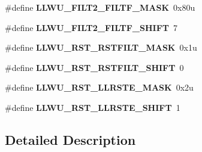 \begin{DoxyCompactItemize}
\item 
\hypertarget{group___l_l_w_u___register___masks_gab60be1393d84433fe44d4b332a77537c}{}\#define {\bfseries L\+L\+W\+U\+\_\+\+F\+I\+L\+T2\+\_\+\+F\+I\+L\+T\+F\+\_\+\+M\+A\+S\+K}~0x80u\label{group___l_l_w_u___register___masks_gab60be1393d84433fe44d4b332a77537c}

\item 
\hypertarget{group___l_l_w_u___register___masks_ga20b3ccaef11cade3a0dc88b3a378b790}{}\#define {\bfseries L\+L\+W\+U\+\_\+\+F\+I\+L\+T2\+\_\+\+F\+I\+L\+T\+F\+\_\+\+S\+H\+I\+F\+T}~7\label{group___l_l_w_u___register___masks_ga20b3ccaef11cade3a0dc88b3a378b790}

\item 
\hypertarget{group___l_l_w_u___register___masks_ga6a909bf1d49bb4f85ad988396fe928f2}{}\#define {\bfseries L\+L\+W\+U\+\_\+\+R\+S\+T\+\_\+\+R\+S\+T\+F\+I\+L\+T\+\_\+\+M\+A\+S\+K}~0x1u\label{group___l_l_w_u___register___masks_ga6a909bf1d49bb4f85ad988396fe928f2}

\item 
\hypertarget{group___l_l_w_u___register___masks_gaaa76fead204f735855760c2f071ac11f}{}\#define {\bfseries L\+L\+W\+U\+\_\+\+R\+S\+T\+\_\+\+R\+S\+T\+F\+I\+L\+T\+\_\+\+S\+H\+I\+F\+T}~0\label{group___l_l_w_u___register___masks_gaaa76fead204f735855760c2f071ac11f}

\item 
\hypertarget{group___l_l_w_u___register___masks_ga9c57c7139b6659782c0a5e160b790c3e}{}\#define {\bfseries L\+L\+W\+U\+\_\+\+R\+S\+T\+\_\+\+L\+L\+R\+S\+T\+E\+\_\+\+M\+A\+S\+K}~0x2u\label{group___l_l_w_u___register___masks_ga9c57c7139b6659782c0a5e160b790c3e}

\item 
\hypertarget{group___l_l_w_u___register___masks_gaf1c8b75e71d3086612da4e1e2f768d72}{}\#define {\bfseries L\+L\+W\+U\+\_\+\+R\+S\+T\+\_\+\+L\+L\+R\+S\+T\+E\+\_\+\+S\+H\+I\+F\+T}~1\label{group___l_l_w_u___register___masks_gaf1c8b75e71d3086612da4e1e2f768d72}

\end{DoxyCompactItemize}


\subsection{Detailed Description}
